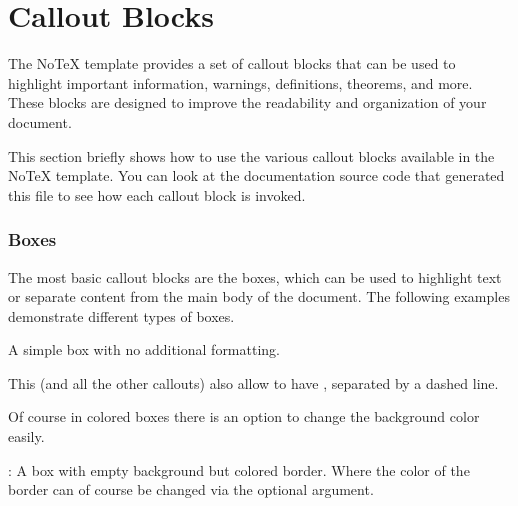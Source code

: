 \documentclass[../main.tex]{subfiles}
\begin{document}
\section{Callout Blocks}

The NoTeX template provides a set of callout blocks that can be used to highlight important information, warnings, definitions, theorems, and more. These blocks are designed to improve the readability and organization of your document.

This section briefly shows how to use the various callout blocks available in the NoTeX template. You can look at the documentation source code that generated this file to see how each callout block is invoked.

\subsubsection{Boxes}

The most basic callout blocks are the boxes, which can be used to highlight text or separate content from the main body of the document. The following examples demonstrate different types of boxes.

\oline

 A simple box with no additional formatting.

\begin{cbox}
    \blindtext
\end{cbox}

This (and all the other callouts) also allow to have , separated by a dashed line.

\begin{cbox}

    \blindtext

    \tcblower %

\end{cbox}

Of course in colored boxes there is an option to change the background color easily.

\begin{cbox}
    \blindtext
\end{cbox}

\oline 

: A box with empty background but colored border. Where the color of the border can of course be changed via the optional argument.
\end{document}
